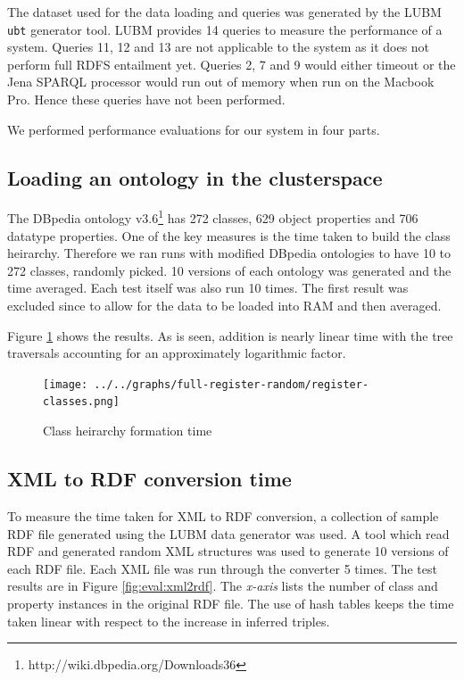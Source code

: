 \documentclass[journal]{IEEEtran}
\begin{document}
The dataset used for the data loading and queries was generated by the
LUBM\cite{Guo05lubm} \texttt{ubt} generator tool. LUBM provides 14 queries to
measure the performance of a system. Queries 11, 12 and 13 are not applicable
to the system as it does not perform full RDFS entailment yet. Queries 2, 7 and
9 would either timeout or the Jena SPARQL processor would run out of memory
when run on the Macbook Pro. Hence these queries have not been performed.

We performed performance evaluations for our system in four parts.

\subsection{Loading an ontology in the clusterspace}

The DBpedia ontology\cite{Auer07dbpedia}
v3.6\footnote{http://wiki.dbpedia.org/Downloads36} has 272 classes, 629 object
properties and 706 datatype properties. One of the key measures is the time
taken to build the class heirarchy. Therefore we ran runs with modified DBpedia
ontologies to have
10 to 272 classes, randomly picked. 10 versions of each ontology was generated
and the time averaged. Each test itself was also run 10 times. The first
result was excluded since to allow for the data to be loaded into RAM and
then averaged.

Figure \ref{fig:eval:cs-ch-form} shows the results. As is seen, addition is
nearly linear time with the tree traversals
accounting for an approximately logarithmic factor.

\begin{figure}[h]
    \centering
    \texttt{[image: ../../graphs/full-register-random/register-classes.png]}
    \caption{Class heirarchy formation time}
    \label{fig:eval:cs-ch-form}
\end{figure}

\subsection{XML to RDF conversion time}

To measure the time taken for XML to RDF conversion, a collection of sample RDF file
generated using the LUBM data generator was used. A tool which read RDF and
generated random XML structures was used to generate 10 versions of each RDF
file. Each XML file was run through the converter 5 times. The test results are
in Figure \ref{fig:eval:xml2rdf}. The \emph{x-axis} lists the number of class
and property instances in the original RDF file. The use of hash tables keeps
the time taken linear with respect to the increase in inferred triples.
\end{document}

